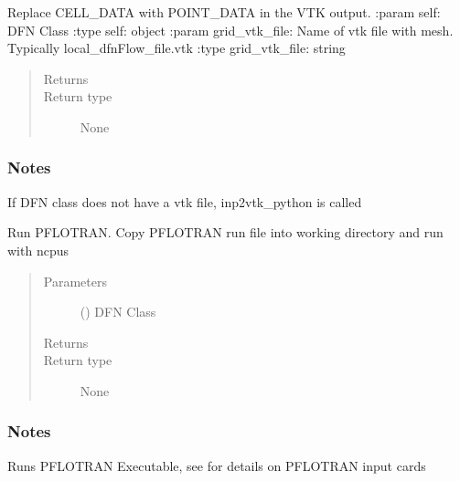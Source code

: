 \documentclass[letterpaper,10pt,english]{sphinxmanual}
\begin{document}
\begin{fulllineitems}
\label{\detokenize{pydfnworks:pydfnworks.dfnFlow.pflotran.parse_pflotran_vtk_python}}
Replace CELL\_DATA with POINT\_DATA in the VTK output.
:param self: DFN Class
:type self: object
:param grid\_vtk\_file: Name of vtk file with mesh. Typically local\_dfnFlow\_file.vtk
:type grid\_vtk\_file: string
\begin{quote}\begin{description}
\item[{Returns}] \leavevmode


\item[{Return type}] \leavevmode
None

\end{description}\end{quote}
\subsubsection*{Notes}

If DFN class does not have a vtk file, inp2vtk\_python is called

\end{fulllineitems}


\begin{fulllineitems}
\label{\detokenize{pydfnworks:pydfnworks.dfnFlow.pflotran.pflotran}}
Run PFLOTRAN. Copy PFLOTRAN run file into working directory and run with ncpus
\begin{quote}\begin{description}
\item[{Parameters}] \leavevmode
{} () \textendash{} DFN Class

\item[{Returns}] \leavevmode


\item[{Return type}] \leavevmode
None

\end{description}\end{quote}
\subsubsection*{Notes}

Runs PFLOTRAN Executable, see  for details on PFLOTRAN input cards

\end{fulllineitems}
\end{document}
